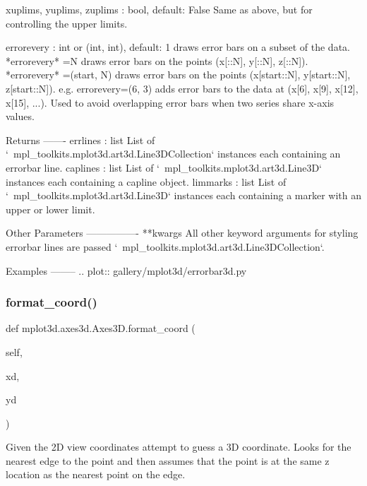 \begin{DoxyVerb}
xuplims, yuplims, zuplims : bool, default: False
    Same as above, but for controlling the upper limits.

errorevery : int or (int, int), default: 1
    draws error bars on a subset of the data. *errorevery* =N draws
    error bars on the points (x[::N], y[::N], z[::N]).
    *errorevery* =(start, N) draws error bars on the points
    (x[start::N], y[start::N], z[start::N]). e.g. errorevery=(6, 3)
    adds error bars to the data at (x[6], x[9], x[12], x[15], ...).
    Used to avoid overlapping error bars when two series share x-axis
    values.

Returns
-------
errlines : list
    List of `~mpl_toolkits.mplot3d.art3d.Line3DCollection` instances
    each containing an errorbar line.
caplines : list
    List of `~mpl_toolkits.mplot3d.art3d.Line3D` instances each
    containing a capline object.
limmarks : list
    List of `~mpl_toolkits.mplot3d.art3d.Line3D` instances each
    containing a marker with an upper or lower limit.

Other Parameters
----------------
**kwargs
    All other keyword arguments for styling errorbar lines are passed
    `~mpl_toolkits.mplot3d.art3d.Line3DCollection`.

Examples
--------
.. plot:: gallery/mplot3d/errorbar3d.py
\end{DoxyVerb}
 \mbox{\label{classmplot3d_1_1axes3d_1_1Axes3D_a116c4c0024c5a0ab00bf0eddf47059a7}} 
\subsubsection{\texorpdfstring{format\+\_\+coord()}{format\_coord()}}
{\footnotesize\ttfamily def mplot3d.\+axes3d.\+Axes3\+D.\+format\+\_\+coord (\begin{DoxyParamCaption}\item[{}]{self,  }\item[{}]{xd,  }\item[{}]{yd }\end{DoxyParamCaption})}

\begin{DoxyVerb}Given the 2D view coordinates attempt to guess a 3D coordinate.
Looks for the nearest edge to the point and then assumes that
the point is at the same z location as the nearest point on the edge.
\end{DoxyVerb}
 \mbox{\label{classmplot3d_1_1axes3d_1_1Axes3D_adb6fe9213e85b7c4e28266884e266604}} 
